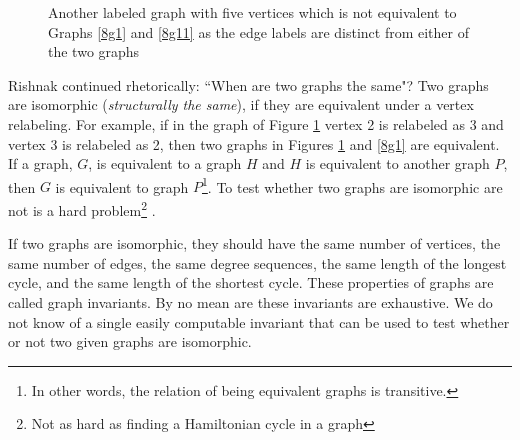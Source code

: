 \begin{figure}
\begin{center}
\caption{ Another labeled graph with five vertices which is not equivalent to Graphs \ref{8g1} and \ref{8g11} as the edge labels are distinct from either of the two graphs}\label{8g2}
\end{center}
\end{figure}

Rishnak continued rhetorically: ``When are two graphs the same"? Two graphs are isomorphic (\emph{structurally the same}), if they are equivalent under a vertex relabeling. For example, if in the graph of Figure \ref{8g2} vertex 2 is relabeled as 3 and vertex 3 is relabeled as 2, then two graphs in Figures \ref{8g2} and \ref{8g1} are equivalent. If a graph, $G$, is equivalent to a graph $H$ and $H$ is equivalent to another graph $P$, then $G$ is equivalent to graph $P$\footnote{In other words, the relation of being equivalent graphs is transitive.}. To test whether two graphs are isomorphic are not is a hard problem\footnote{Not as hard as finding a Hamiltonian cycle in a graph} .

If two graphs are isomorphic, they should have the same number of vertices, the same number of edges, the same degree sequences, the same length of the longest cycle, and the same length of the shortest cycle.  These properties of graphs are called graph invariants. By no mean are these invariants are exhaustive. We do not know of a single easily computable invariant that can be used to test whether or not two given graphs are isomorphic. 

